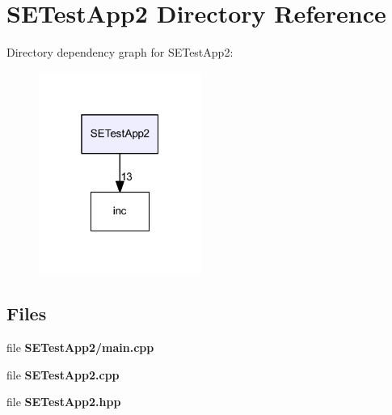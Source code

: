\section{S\+E\+Test\+App2 Directory Reference}
\label{dir_3dbfebdedb231d3cc87d66e60658cd95}
Directory dependency graph for S\+E\+Test\+App2\+:
\nopagebreak
\begin{figure}[H]
\begin{center}
\leavevmode
\includegraphics[width=151pt]{dir_3dbfebdedb231d3cc87d66e60658cd95_dep}
\end{center}
\end{figure}
\subsection*{Files}
\begin{DoxyCompactItemize}
\item 
file {\bf S\+E\+Test\+App2/main.\+cpp}
\item 
file {\bf S\+E\+Test\+App2.\+cpp}
\item 
file {\bf S\+E\+Test\+App2.\+hpp}
\end{DoxyCompactItemize}
